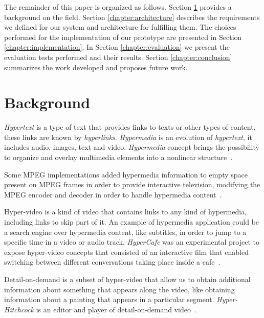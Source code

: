 \documentclass[10pt,conference]{IEEEtran}
\begin{document}
The remainder of this paper is organized as follows.
Section \ref{chapter:relatedwork} provides a background on the field.
Section \ref{chapter:architecture} describes the requirements we defined for our system and architecture for fulfilling them.
The choices performed for the implementation of our prototype are presented in Section \ref{chapter:implementation}.
In Section \ref{chapter:evaluation} we present the evaluation tests performed and their results.
Section \ref{chapter:conclusion} summarizes the work developed and proposes future work.









\section{Background}
\label{chapter:relatedwork}


\emph{Hypertext} is a type of text that provides links to texts or other types of content, these links are known by \emph{hyperlinks}. 
\emph{Hypermedia} is an evolution of \emph{hypertext}, it includes audio, images, text and video. 
\emph{Hypermedia} concept brings the possibility to organize and overlay multimedia elements into a nonlinear structure~\cite{geddes}.

Some \gls{MPEG} implementations added hypermedia information to empty space present on \gls{MPEG} frames in order to provide interactive television, modifying the \gls{MPEG} encoder and decoder in order to handle hypermedia content~\cite{embedded}.

Hyper-video is a kind of video that contains links to any kind of hypermedia, including links to skip part of it. An example of hypermedia application could be a search engine over hypermedia content, like subtitles, in order to jump to a specific time in a video or audio track.
\emph{HyperCafe} was an experimental project to expose hyper-video concepts that consisted of an interactive film that enabled switching between different conversations taking place inside a cafe~\cite{hypercafe}.
 
Detail-on-demand is a subset of hyper-video that allow us to obtain additional information about something that appears along the video, like obtaining information about a painting that appears in a particular segment. 
\emph{Hyper-Hitchcock} is an editor and player of detail-on-demand video~\cite{hitchcock}.
\end{document}
